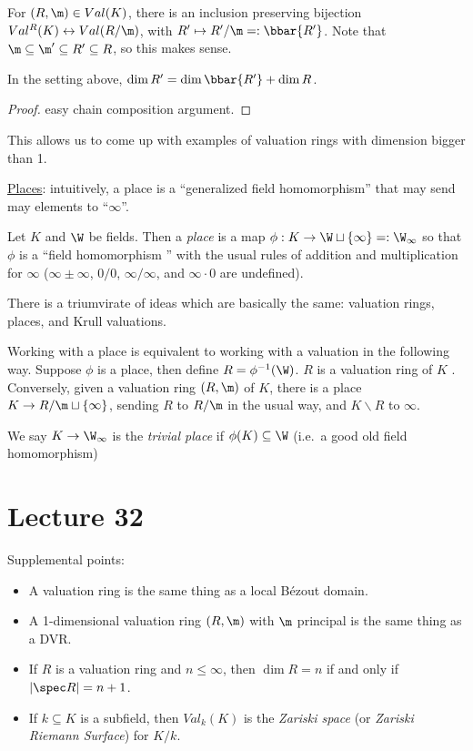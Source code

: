  \begin{theorem}[4.13]
   For $(R,\m)\in Val(K)$, there is an inclusion preserving bijection
   $Val^R(K)\leftrightarrow Val(R/\m)$, with $R'\mapsto R'/\m =: \bbar {R'}$. Note that
   $\m\subseteq \m'\subseteq R'\subseteq R$, so this makes sense.
 \end{theorem}
 \begin{corollary}
   In the setting above, $\dim R' = \dim \bbar{R'} + \dim R$.
 \end{corollary}
 \begin{proof}
   easy chain composition argument.
 \end{proof}
 This allows us to come up with examples of valuation rings with dimension bigger than 1.

 \underline{Places}: intuitively, a place is a ``generalized field homomorphism'' that
 may send may elements to ``$\infty$''.
 \begin{definition}
   Let $K$ and $\W$ be fields. Then a \emph{place} is a map $\phi:K\to \W\sqcup
   \{\infty\} =: \W_\infty$ so that $\phi$ is a ``field homomorphism '' with the usual
   rules of addition and multiplication for $\infty$ ($\infty \pm \infty$, $0/0$,
   $\infty/\infty$, and $\infty\cdot 0$ are undefined).
 \end{definition}
 There is a triumvirate of ideas which are basically the same: valuation rings, places,
 and Krull valuations.

 Working with a place is equivalent to working with a valuation in the following way.
 Suppose $\phi$ is a place, then define $R=\phi^{-1}(\W)$. $R$ is a valuation ring of $K$
 \anton{}. Conversely, given a valuation ring $(R,\m)$ of $K$, there is a place $K\to
 R/\m \sqcup \{\infty\}$, sending $R$ to $R/\m$ in the usual way, and $K\smallsetminus R$
 to $\infty$.

 We say $K\to \W_\infty$ is the \emph{trivial place} if $\phi(K)\subseteq \W$ (i.e.~a
 good old field homomorphism)
 \setcounter{lecture}{32}
 \section{Lecture 32}

 Supplemental points:
 \begin{itemize}
   \item A valuation ring is the same thing as a local B\'ezout domain.
   \item A 1-dimensional valuation ring $(R,\m)$ with $\m$ principal is the same thing as a DVR.
   \item If $R$ is a valuation ring and $n\le \infty$, then $\dim R=n$ if and only if
   $|\spec R|=n+1$.
   \item If $k\subseteq K$ is a subfield, then $Val_k(K)$ is the \emph{Zariski space} (or
   \emph{Zariski Riemann Surface}) for $K/k$.
 \end{itemize}

